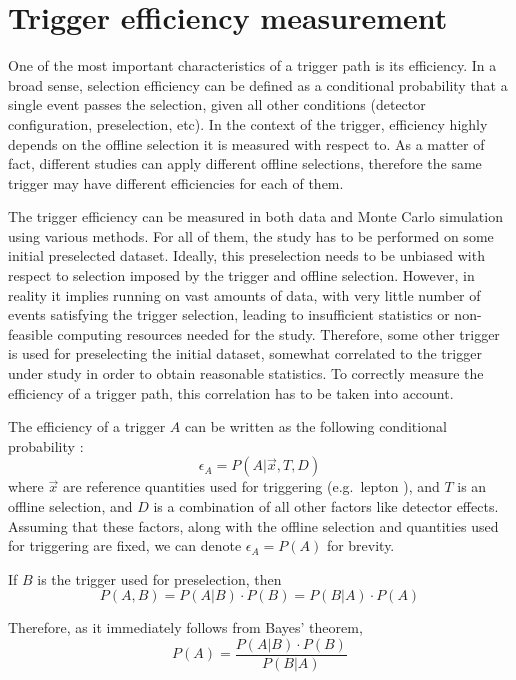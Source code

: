 \section{Trigger efficiency measurement}
\label{s:trigger_efficicency_measurement}
One of the most important characteristics of a trigger path is its efficiency. In a broad sense, selection efficiency
can be defined as a conditional probability that a single event passes the selection, given all other conditions
(detector configuration, preselection, etc). In the context of the trigger, efficiency highly depends on the offline
selection it is measured with respect to. As a matter of fact, different studies can apply different offline selections,
therefore the same trigger may have different efficiencies for each of them.

The trigger efficiency can be measured in both data and Monte Carlo simulation using various methods. For all of them,
the study has to be performed on some initial preselected dataset. Ideally, this preselection needs to be unbiased with
respect to selection imposed by the trigger and offline selection. However, in reality it implies running on vast
amounts of data, with very little number of events satisfying the trigger selection, leading to insufficient statistics
or non-feasible computing resources needed for the study. Therefore, some other trigger is used for preselecting the
initial dataset, somewhat correlated to the trigger under study in order to obtain reasonable statistics. To correctly
measure the efficiency of a trigger path, this correlation has to be taken into account.

The efficiency of a trigger $A$ can be written as the following conditional probability \autocite{selection_efficiency}:
\begin{equation}
\epsilon_{A} = P(A | \vec{x}, T, D)
\end{equation}
where $\vec{x}$ are reference quantities used for triggering (e.g.\ lepton \pt), and $T$ is an offline selection, and
$D$ is a combination of all other factors like detector effects. Assuming that these factors, along with the offline
selection and quantities used for triggering are fixed, we can denote $\epsilon_{A} = P(A)$ for brevity.

If $B$ is the trigger used for preselection, then
\begin{equation}
P(A, B) = P(A | B) \cdot P(B) = P(B | A) \cdot P(A)
\end{equation}

Therefore, as it immediately follows from Bayes' theorem,
\begin{equation}
P(A) = \frac{P(A | B) \cdot P(B)}{P(B | A)}
\end{equation}

